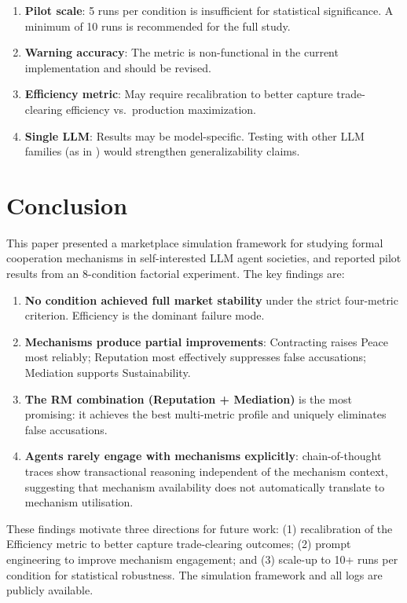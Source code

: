 \documentclass[12pt, a4paper]{article}
\begin{document}
\begin{enumerate}
  \item \textbf{Pilot scale}: 5 runs per condition is insufficient for statistical significance. A minimum of 10 runs is recommended for the full study.
  \item \textbf{Warning accuracy}: The metric is non-functional in the current implementation and should be revised.
  \item \textbf{Efficiency metric}: May require recalibration to better capture trade-clearing efficiency vs.\ production maximization.
  \item \textbf{Single LLM}: Results may be model-specific. Testing with other LLM families (as in \citet{coopeval}) would strengthen generalizability claims.
\end{enumerate}

\section{Conclusion}
\label{sec:conclusion}

This paper presented a marketplace simulation framework for studying formal cooperation mechanisms in self-interested LLM agent societies, and reported pilot results from an 8-condition factorial experiment. The key findings are:

\begin{enumerate}
  \item \textbf{No condition achieved full market stability} under the strict four-metric criterion. Efficiency is the dominant failure mode.
  \item \textbf{Mechanisms produce partial improvements}: Contracting raises Peace most reliably; Reputation most effectively suppresses false accusations; Mediation supports Sustainability.
  \item \textbf{The RM combination (Reputation + Mediation)} is the most promising: it achieves the best multi-metric profile and uniquely eliminates false accusations.
  \item \textbf{Agents rarely engage with mechanisms explicitly}: chain-of-thought traces show transactional reasoning independent of the mechanism context, suggesting that mechanism availability does not automatically translate to mechanism utilisation.
\end{enumerate}

These findings motivate three directions for future work: (1) recalibration of the Efficiency metric to better capture trade-clearing outcomes; (2) prompt engineering to improve mechanism engagement; and (3) scale-up to 10+ runs per condition for statistical robustness. The simulation framework and all logs are publicly available.
\end{document}

